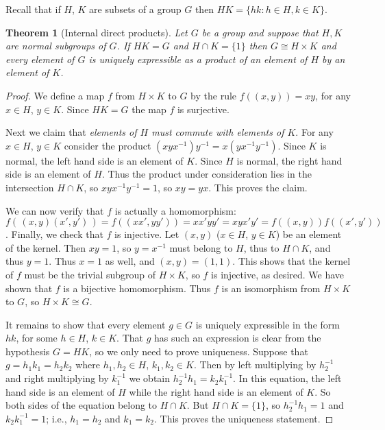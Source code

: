 \documentclass[11pt,oneside]{article}
\newtheorem{thm}{Theorem}[section]
\theoremstyle{definition}
\begin{document}
Recall that if $H$, $K$ are subsets of a group $G$ then $HK = \{ hk: h
\in H, k \in K \}$. 



\begin{thm}[Internal direct products]
Let $G$ be a group and suppose that $H,K$ are normal subgroups of
$G$. If $H K = G$ and $H \cap K = \{1\}$ then $G \cong H \times K$ and
every element of $G$ is uniquely expressible as a product of an
element of $H$ by an element of $K$.
\end{thm}

\begin{proof}
We define a map $f$ from $H \times K$ to $G$ by the rule $f((x,y)) =
xy$, for any $x\in H$, $y \in K$.  Since $HK=G$ the map $f$ is
surjective.  

Next we claim that {\em elements of $H$ must commute with elements of
  $K$}. For any $x \in H$, $y \in K$ consider the product
$(xyx^{-1})y^{-1} = x(yx^{-1} y^{-1})$. Since $K$ is normal, the left
hand side is an element of $K$. Since $H$ is normal, the right hand
side is an element of $H$. Thus the product under consideration lies
in the intersection $H \cap K$, so $xyx^{-1}y^{-1} = 1$, so $xy =
yx$. This proves the claim.

We can now verify that $f$ is actually a homomorphism:
$f(\,(x,y)(x',y')\,) = f( (xx',yy')) = xx'yy' = xyx'y' = f((x,y))
f((x',y'))$.  Finally, we check that $f$ is injective. Let $(x,y)$
($x\in H$, $y\in K$) be an element of the kernel. Then $xy = 1$, so $y
= x^{-1}$ must belong to $H$, thus to $H \cap K$, and thus $y =
1$. Thus $x=1$ as well, and $(x,y) = (1,1)$. This shows that the
kernel of $f$ must be the trivial subgroup of $H \times K$, so $f$ is
injective, as desired.  We have shown that $f$ is a bijective
homomorphism. Thus $f$ is an isomorphism from $H \times K$ to $G$, so
$H \times K \cong G$.

It remains to show that every element $g \in G$ is uniquely
expressible in the form $hk$, for some $h \in H$, $k \in K$. That $g$
has such an expression is clear from the hypothesis $G=HK$, so we only
need to prove uniqueness. Suppose that $g = h_1k_1 = h_2k_2$ where
$h_1, h_2 \in H$, $k_1, k_2 \in K$. Then by left multiplying by
$h_2^{-1}$ and right multiplying by $k_1^{-1}$ we obtain $h_2^{-1} h_1
= k_2 k_1^{-1}$. In this equation, the left hand side is an element of
$H$ while the right hand side is an element of $K$. So both sides of
the equation belong to $H \cap K$. But $H \cap K = \{1\}$, so
$h_2^{-1} h_1 = 1$ and $k_2 k_1^{-1} = 1$; i.e., $h_1 = h_2$ and $k_1
= k_2$. This proves the uniqueness statement.
\end{proof}
\end{document}
